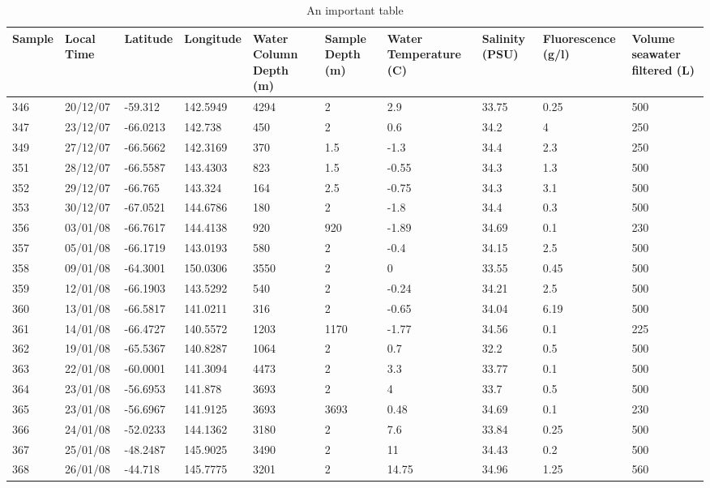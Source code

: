\begin{sidewaystable}
\caption[IMPORTANT TABLE]{An important table}
\label{tab:samplelist}
\begin{tabularx}{\textheight}{llllXXXXXX}
\toprule
Sample & Local Time & Latitude & Longitude & Water Column Depth (m) & Sample Depth (m) & Water \linebreak Temperature (\textdegree{}C) & Salinity (PSU) & Fluorescence (\textmu{}g/l) & Volume \linebreak seawater \linebreak filtered (L) \\
\midrule
346 & 20/12/07 & -59.312 & 142.5949 & 4294 & 2 & 2.9 & 33.75 & 0.25 & 500\\
347 & 23/12/07 & -66.0213 & 142.738 & 450 & 2 & 0.6 & 34.2 & 4 & 250\\
349 & 27/12/07 & -66.5662 & 142.3169 & 370 & 1.5 & -1.3 & 34.4 & 2.3 & 250\\
351 & 28/12/07 & -66.5587 & 143.4303 & 823 & 1.5 & -0.55 & 34.3 & 1.3 & 500\\
352 & 29/12/07 & -66.765 & 143.324 & 164 & 2.5 & -0.75 & 34.3 & 3.1 & 500\\
353 & 30/12/07 & -67.0521 & 144.6786 & 180 & 2 & -1.8 & 34.4 & 0.3 & 500\\
356 & 03/01/08 & -66.7617 & 144.4138 & 920 & 920 & -1.89 & 34.69 & 0.1 & 230\\
357 & 05/01/08 & -66.1719 & 143.0193 & 580 & 2 & -0.4 & 34.15 & 2.5 & 500\\
358 & 09/01/08 & -64.3001 & 150.0306 & 3550 & 2 & 0 & 33.55 & 0.45 & 500\\
359 & 12/01/08 & -66.1903 & 143.5292 & 540 & 2 & -0.24 & 34.21 & 2.5 & 500\\
360 & 13/01/08 & -66.5817 & 141.0211 & 316 & 2 & -0.65 & 34.04 & 6.19 & 500\\
361 & 14/01/08 & -66.4727 & 140.5572 & 1203 & 1170 & -1.77 & 34.56 & 0.1 & 225\\
362 & 19/01/08 & -65.5367 & 140.8287 & 1064 & 2 & 0.7 & 32.2 & 0.5 & 500\\
363 & 22/01/08 & -60.0001 & 141.3094 & 4473 & 2 & 3.3 & 33.77 & 0.1 & 500\\
364 & 23/01/08 & -56.6953 & 141.878 & 3693 & 2 & 4 & 33.7 & 0.5 & 500\\
365 & 23/01/08 & -56.6967 & 141.9125 & 3693 & 3693 & 0.48 & 34.69 & 0.1 & 230\\
366 & 24/01/08 & -52.0233 & 144.1362 & 3180 & 2 & 7.6 & 33.84 & 0.25 & 500\\
367 & 25/01/08 & -48.2487 & 145.9025 & 3490 & 2 & 11 & 34.43 & 0.2 & 500\\
368 & 26/01/08 & -44.718 & 145.7775 & 3201 & 2 & 14.75 & 34.96 & 1.25 & 560\\
\bottomrule
\end{tabularx}
\end{sidewaystable}

